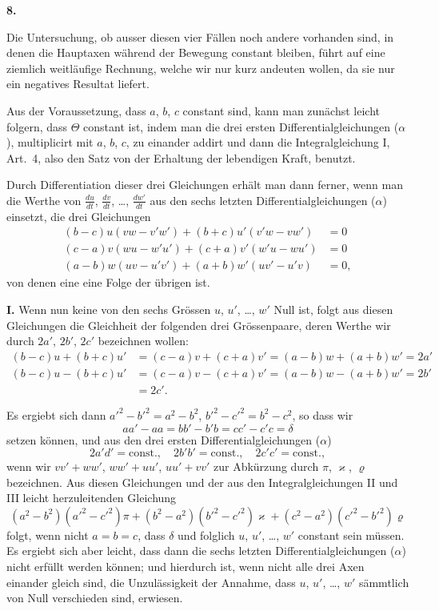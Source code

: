 \documentclass[12pt,a4paper]{book}
\theoremstyle{definition}
\theoremstyle{remark}
\begin{document}
\begin{center}
\textbf{8.}
\end{center}

Die Untersuchung, ob ausser diesen vier F\"allen noch andere vorhanden sind, in denen die Hauptaxen w\"ahrend der Bewegung constant bleiben, f\"uhrt auf eine ziemlich weitl\"aufige Rechnung, welche wir nur kurz andeuten wollen, da sie nur ein negatives Resultat liefert.

Aus der Voraussetzung, dass $a$, $b$, $c$ constant sind, kann man zun\"achst leicht folgern, dass $\Theta$ constant ist, indem man die drei ersten Differentialgleichungen ($\alpha$), multiplicirt mit $a$, $b$, $c$, zu einander addirt und dann die Integralgleichung I, Art.~4, also den Satz von der Erhaltung der lebendigen Kraft, benutzt.

Durch Differentiation dieser drei Gleichungen erh\"alt man dann ferner, wenn man die Werthe von $\frac{du}{dt}$, $\frac{dv}{dt}$, \dots, $\frac{dw'}{dt}$ aus den sechs letzten Differentialgleichungen ($\alpha$) einsetzt, die drei Gleichungen
\begin{align*}
(b - c)u(vw - v'w') + (b + c)u'(v'w - vw') &= 0\\
(c - a)v(wu - w'u') + (c + a)v'(w'u - wu') &= 0\\
(a - b)w(uv - u'v') + (a + b)w'(uv' - u'v) &= 0,\tag{1}
\end{align*}
von denen eine eine Folge der \"ubrigen ist.

\smallskip
\noindent\textbf{I.} Wenn nun keine von den sechs Gr\"ossen $u$, $u'$, \dots, $w'$ Null ist, folgt aus diesen Gleichungen die Gleichheit der folgenden drei Gr\"ossenpaare, deren Werthe wir durch $2a'$, $2b'$, $2c'$ bezeichnen wollen:
\begin{align*}
(b-c)u + (b+c)u' &= (c-a)v + (c+a)v' = (a-b)w + (a+b)w' = 2a'\\
(b-c)u - (b+c)u' &= (c-a)v - (c+a)v' = (a-b)w - (a+b)w' = 2b'\\
&= 2c'.\tag{2}
\end{align*}

Es ergiebt sich dann $a'^{2} - b'^{2} = a^{2} - b^{2}$, $b'^{2} - c'^{2} = b^{2} - c^{2}$, so dass wir
\[
aa' - aa = bb' - b'b = cc' - c'c = \delta
\]
setzen k\"onnen, und aus den drei ersten Differentialgleichungen ($\alpha$)
\[
2a'd' = \text{const.},\quad 2b'b' = \text{const.},\quad 2c'c' = \text{const.},
\]
wenn wir $vv' + ww'$, $ww' + uu'$, $uu' + vv'$ zur Abk\"urzung durch $\pi$, $\varkappa$, $\varrho$ bezeichnen. Aus diesen Gleichungen und der aus den Integralgleichungen II und III leicht herzuleitenden Gleichung
\[
(a^{2} - b^{2})(a'^{2} - c'^{2})\pi + (b^{2} - a^{2})(b'^{2} - c'^{2})\varkappa + (c^{2} - a^{2})(c'^{2} - b'^{2})\varrho
\]
folgt, wenn nicht $a = b = c$, dass $\delta$ und folglich $u$, $u'$, \dots, $w'$ constant sein m\"ussen. Es ergiebt sich aber leicht, dass dann die sechs letzten Differentialgleichungen ($\alpha$) nicht erf\"ullt werden k\"onnen; und hierdurch ist, wenn nicht alle drei Axen einander gleich sind, die Unzul\"assigkeit der Annahme, dass $u$, $u'$, \dots, $w'$ s\"ammtlich von Null verschieden sind, erwiesen.
\end{document}
